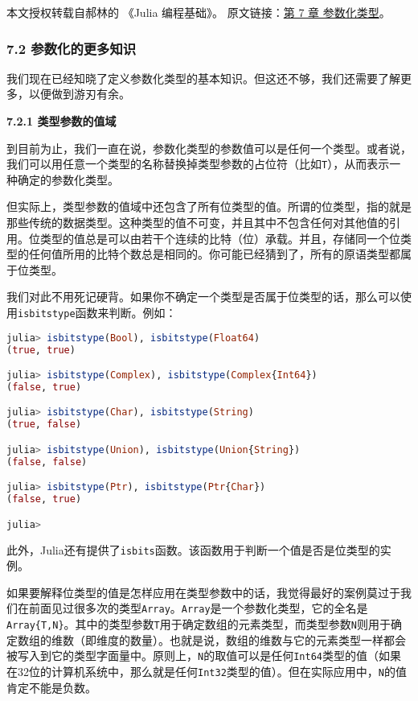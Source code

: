 
本文授权转载自郝林的 《Julia 编程基础》。 原文链接：\href{https://github.com/hyper0x/JuliaBasics/blob/master/book/ch07.md}{第 7 章 参数化类型}。


\subsubsection{7.2 参数化的更多知识}

我们现在已经知晓了定义参数化类型的基本知识。但这还不够，我们还需要了解更多，以便做到游刃有余。

\textbf{7.2.1 类型参数的值域}

到目前为止，我们一直在说，参数化类型的参数值可以是任何一个类型。或者说，我们可以用任意一个类型的名称替换掉类型参数的占位符（比如\verb`T`），从而表示一种确定的参数化类型。

但实际上，类型参数的值域中还包含了所有位类型的值。所谓的位类型，指的就是那些传统的数据类型。这种类型的值不可变，并且其中不包含任何对其他值的引用。位类型的值总是可以由若干个连续的比特（位）承载。并且，存储同一个位类型的任何值所用的比特个数总是相同的。你可能已经猜到了，所有的原语类型都属于位类型。

我们对此不用死记硬背。如果你不确定一个类型是否属于位类型的话，那么可以使用\verb`isbitstype`函数来判断。例如：
\begin{lstlisting}[language=julia]
julia> isbitstype(Bool), isbitstype(Float64)
(true, true)

julia> isbitstype(Complex), isbitstype(Complex{Int64})
(false, true)

julia> isbitstype(Char), isbitstype(String)
(true, false)

julia> isbitstype(Union), isbitstype(Union{String})
(false, false)

julia> isbitstype(Ptr), isbitstype(Ptr{Char})
(false, true)

julia> 
\end{lstlisting}

此外，Julia还有提供了\verb`isbits`函数。该函数用于判断一个值是否是位类型的实例。

如果要解释位类型的值是怎样应用在类型参数中的话，我觉得最好的案例莫过于我们在前面见过很多次的类型\verb`Array`。\verb`Array`是一个参数化类型，它的全名是\verb`Array{T,N}`。其中的类型参数\verb`T`用于确定数组的元素类型，而类型参数\verb`N`则用于确定数组的维数（即维度的数量）。也就是说，数组的维数与它的元素类型一样都会被写入到它的类型字面量中。原则上，\verb`N`的取值可以是任何\verb`Int64`类型的值（如果在32位的计算机系统中，那么就是任何\verb`Int32`类型的值）。但在实际应用中，\verb`N`的值肯定不能是负数。

